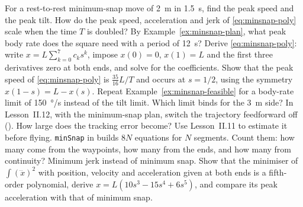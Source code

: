 \begin{exercises}
\exercise[1] For a rest-to-rest minimum-snap move of \SI{2}{m} in \SI{1.5}{s}, find the peak speed and the peak tilt.
\exercise[1] How do the peak speed, acceleration and jerk of \cref{eq:minsnap-poly} scale when the time $T$ is doubled?
\exercise[1] By Example~\ref{ex:minsnap-plan}, what peak body rate does the square need with a period of \SI{12}{s}?
\exercise[2]\label{ex:minsnap-derive} Derive \cref{eq:minsnap-poly}: write $x = L\sum_{k=0}^7 c_k s^k$, impose $x(0) = 0$, $x(1) = L$ and the first three derivatives zero at both ends, and solve for the coefficients.
\exercise[2] Show that the peak speed of \cref{eq:minsnap-poly} is $\tfrac{35}{16}L/T$ and occurs at $s = 1/2$, using the symmetry $x(1 - s) = L - x(s)$.
\exercise[2] Repeat Example~\ref{ex:minsnap-feasible} for a body-rate limit of \SI{150}{\degree/s} instead of the tilt limit. Which limit binds for the \SI{3}{m} side?
\exercise[2] In Lesson~II.12, with the minimum-snap plan, switch the trajectory feedforward off (). How large does the tracking error become? Use Lesson~II.11 to estimate it before flying.
\exercise[2] \texttt{minSnap} in  builds $8N$ equations for $N$ segments. Count them: how many come from the waypoints, how many from the ends, and how many from continuity?
\exercise[3] Minimum jerk instead of minimum snap. Show that the minimiser of $\int(\dddot x)^2$ with position, velocity and acceleration given at both ends is a fifth-order polynomial, derive $x = L(10s^3 - 15s^4 + 6s^5)$, and compare its peak acceleration with that of minimum snap.
\end{exercises}
